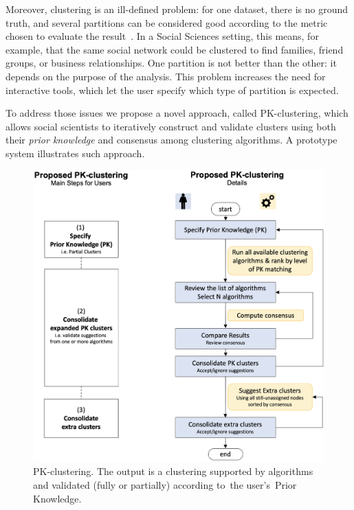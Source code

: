 Moreover, clustering is an ill-defined problem: for one dataset, there is no ground truth, and several partitions can be considered good according to the metric chosen to evaluate the result~\cite{kleinberg2003impossibility}.
In a Social Sciences setting, this means, for example, that the same social network could be clustered to find families, friend groups, or business relationships.
One partition is not better than the other: it depends on the purpose of the analysis.
This problem increases the need for interactive tools, which let the user specify which type of partition is expected.

To address those issues we propose a novel approach, called PK-clustering, which allows social scientists to iteratively construct and validate clusters using both their \emph{prior knowledge} and consensus among clustering algorithms.
A prototype system illustrates such approach.


\begin{figure}
    \centering
    \includegraphics[width=\textwidth]{static/figures/PK-Clustering/VISPaperFigures/pkprocess_new}
    \caption{PK-clustering. The output is a clustering supported by algorithms and validated (fully or partially) according to the user's Prior Knowledge.}
\label{fig:PK-pkprocess}
\end{figure}

